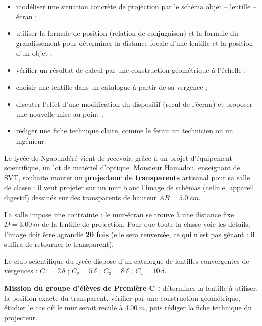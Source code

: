 \documentclass[11pt]{article}
\newcommand{\cle}[1]{{\popxbold\color{popdark}#1}}
\newcounter{popsec}
\newcounter{popsub}
\newcommand{\courssub}[1]{%
  \stepcounter{popsub}%
  \par\vspace{9pt}\noindent{\popxbold\fontsize{11.5}{13}\selectfont\color{popink}{\color{poporange}\thepopsec.\thepopsub}\hspace{6pt}#1}\par\nopagebreak\vspace{4pt}
}
\begin{document}
\begin{itemize}
\item modéliser une situation concrète de projection par le schéma objet -- lentille -- écran ;
\item utiliser la \cle{formule de position} (relation de conjugaison) et la formule du \cle{grandissement} pour déterminer la distance focale d'une lentille et la position d'un objet ;
\item vérifier un résultat de calcul par une \cle{construction géométrique} à l'échelle ;
\item choisir une lentille dans un catalogue à partir de sa \cle{vergence} ;
\item discuter l'effet d'une modification du dispositif (recul de l'écran) et proposer une nouvelle mise au point ;
\item rédiger une fiche technique claire, comme le ferait un technicien ou un ingénieur.
\end{itemize}

\courssub{Situation}

Le lycée de Ngaoundéré vient de recevoir, grâce à un projet d'équipement scientifique, un lot de matériel d'optique. Monsieur Hamadou, enseignant de SVT, souhaite monter un \textbf{projecteur de transparents} artisanal pour sa salle de classe : il veut projeter sur un mur blanc l'image de schémas (cellule, appareil digestif) dessinés sur des transparents de hauteur $AB = \SI{5,0}{cm}$.

La salle impose une contrainte : le mur-écran se trouve à une distance fixe $D = \SI{3,00}{m}$ de la lentille de projection. Pour que toute la classe voie les détails, l'image doit être agrandie \textbf{20 fois} (elle sera renversée, ce qui n'est pas gênant : il suffira de retourner le transparent).

Le club scientifique du lycée dispose d'un catalogue de lentilles convergentes de vergences : $C_1 = 2\,\delta$ ; $C_2 = 5\,\delta$ ; $C_3 = 8\,\delta$ ; $C_4 = 10\,\delta$.

\textbf{Mission du groupe d'élèves de Première C :} déterminer la lentille à utiliser, la position exacte du transparent, vérifier par une construction géométrique, étudier le cas où le mur serait reculé à $\SI{4,00}{m}$, puis rédiger la fiche technique du projecteur.

\courssub{Consignes}
\end{document}
